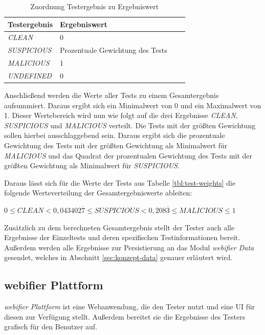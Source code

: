 \begin{table}[H]
\centering
\begin{tabular}{|l|l|l|l|}
\hline
\textbf{Testergebnis} & \textbf{Ergebniswert}\\\hline
\textit{CLEAN} & 0\\\hline
\textit{SUSPICIOUS} & Prozentuale Gewichtung des Tests\\\hline
\textit{MALICIOUS} & 1\\\hline
\textit{UNDEFINED} & 0\\\hline
\end{tabular}
\caption{Zuordnung Testergebnis zu Ergebniswert}
\label{tbl:test-values}
\end{table}

Anschließend werden die Werte aller Tests zu einem Gesamtergebnis aufsummiert. Daraus ergibt sich ein Minimalwert von 0 und ein Maximalwert von 1. Dieser Wertebereich wird nun wie folgt auf die drei Ergebnisse \textit{CLEAN}, \textit{SUSPICIOUS} und \textit{MALICIOUS} verteilt. Die Tests mit der größten Gewichtung sollen hierbei ausschlaggebend sein. Daraus ergibt sich die prozentuale Gewichtung des Tests mit der größten Gewichtung als Minimalwert für \textit{MALICIOUS} und das Quadrat der prozentualen Gewichtung des Tests mit der größten Gewichtung als Minimalwert für \textit{SUSPICIOUS}.

Daraus lässt sich für die Werte der Tests aus Tabelle \ref{tbl:test-weights} die folgende Werteverteilung der Gesamtergebniswerte ableiten:

\begin{center}
$0 \leq CLEAN < 0,043402\overline{7} \leq SUSPICIOUS < 0,208\overline{3} \leq MALICIOUS \leq 1$
\end{center}

Zusätzlich zu dem berechneten Gesamtergebnis stellt der Tester auch alle Ergebnisse der Einzeltests
und deren spezifischen Testinformationen bereit. Außerdem werden alle Ergebnisse zur Persistierung an
das Modul \textit{webifier Data} gesendet, welches in Abschnitt \ref{sec:konzept-data} genauer erläutert wird.

\subsection{webifier Plattform}

\textit{webifier Plattform} ist eine Webanwendung, die den Tester nutzt und eine \ac{UI} für diesen
zur Verfügung stellt. Außerdem bereitet sie die Ergebnisse des Testers grafisch für den Benutzer auf.

